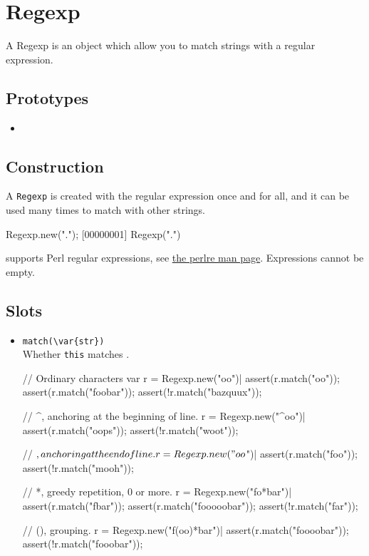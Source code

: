 \section{Regexp}

A Regexp is an object which allow you to match strings with a regular
expression.

\subsection{Prototypes}
\begin{itemize}
\item {}
\end{itemize}

\subsection{Construction}
\label{stdlib:regexp:ctor}

A \lstinline{Regexp} is created with the regular expression once and
for all, and it can be used many times to match with other strings.

\begin{urbiscript}[firstnumber=1]
Regexp.new(".");
[00000001] Regexp(".")
\end{urbiscript}

\us supports Perl regular expressions, see
\href{http://perldoc.perl.org/perlre.html}{the perlre man page}.
Expressions cannot be empty.

\subsection{Slots}
\begin{itemize}
\item \lstinline|match(\var{str})|\\
  Whether \lstinline|this| matches .
\begin{urbiscript}
// Ordinary characters
var r = Regexp.new("oo")|
assert(r.match("oo"));
assert(r.match("foobar"));
assert(!r.match("bazquux"));

// ^, anchoring at the beginning of line.
r = Regexp.new("^oo")|
assert(r.match("oops"));
assert(!r.match("woot"));

// $, anchoring at the end of line.
r = Regexp.new("oo$")|
assert(r.match("foo"));
assert(!r.match("mooh"));

// *, greedy repetition, 0 or more.
r = Regexp.new("fo*bar")|
assert(r.match("fbar"));
assert(r.match("fooooobar"));
assert(!r.match("far"));

// (), grouping.
r = Regexp.new("f(oo)*bar")|
assert(r.match("foooobar"));
assert(!r.match("fooobar"));
\end{urbiscript}

\end{itemize}

